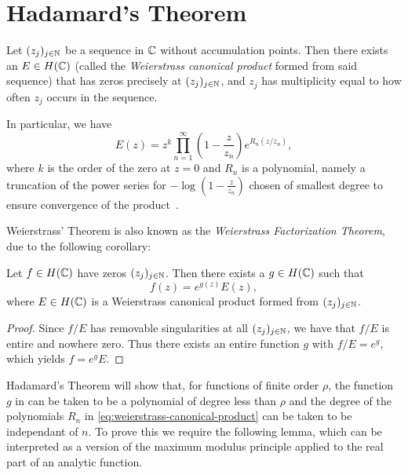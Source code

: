 \section{Hadamard's Theorem}
\label{sec:hadamards-theorem}

\begin{theorem} \label{thm:weierstrass}
    Let $(z_j)_{j \in \mathbb{N}}$ be a sequence in $\mathbb{C}$ without accumulation points. Then there exists an $E \in H(\mathbb{C})$ (called the \emph{Weierstrass canonical product} formed from said sequence) that has zeros precisely at $(z_j)_{j \in \mathbb{N}}$, and $z_j$ has multiplicity equal to how often $z_j$ occurs in the sequence.
\end{theorem}

In particular, we have
\begin{equation} \label{eq:weierstrass-canonical-product}
    E(z) = z^k \prod_{n=1}^\infty \left( 1 - \frac{z}{z_n} \right) e^{R_n(z / z_n)},
\end{equation}
where $k$ is the order of the zero at $z = 0$ and $R_n$ is a polynomial, namely a truncation of the power series for $-\log(1 - \frac{z}{z_n})$ chosen of smallest degree to ensure convergence of the product~\cite{segal-complex-analysis}.

Weierstrass' Theorem is also known as the \emph{Weierstrass Factorization Theorem}, due to the following corollary:

\begin{corollary} \label{cor:weierstrass-factorization}
    Let $f \in H(\mathbb{C})$ have zeros $(z_j)_{j \in \mathbb{N}}$. Then there exists a $g \in H(\mathbb{C})$ such that
    $$ f(z) = e^{g(z)} E(z), $$
    where $E \in H(\mathbb{C})$ is a Weierstrass canonical product formed from $(z_j)_{j \in \mathbb{N}}$.
\end{corollary}

\begin{proof}
    Since $f / E$ has removable singularities at all $(z_j)_{j \in \mathbb{N}}$, we have that $f / E$ is entire and nowhere zero. Thus there exists an entire function $g$ with $f / E = e^g$, which yields $f = e^g E$.
\end{proof}

Hadamard's Theorem will show that, for functions of finite order $\rho$, the function $g$ in  can be taken to be a polynomial of degree less than $\rho$ and the degree of the polynomials $R_n$ in \eqref{eq:weierstrass-canonical-product} can be taken to be independant of $n$. To prove this we require the following lemma, which can be interpreted as a version of the maximum modulus principle applied to the real part of an analytic function.

